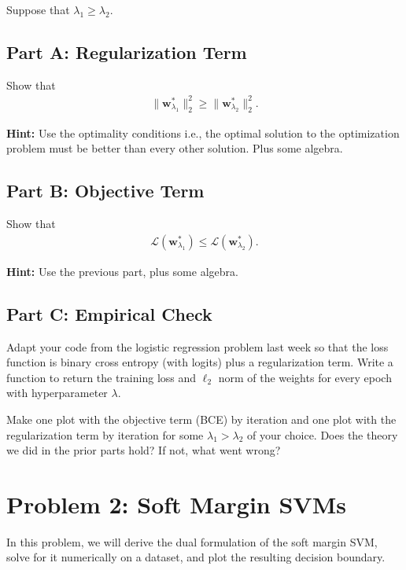 \documentclass{article}
\begin{document}
Suppose that $\lambda_1 \geq \lambda_2$.

\subsection*{Part A: Regularization Term}

Show that
\begin{align}
    \| \mathbf{w}^*_{\lambda_1} \|_2^2 \geq
    \| \mathbf{w}^*_{\lambda_2} \|_2^2.
\end{align}

\textbf{Hint:} Use the optimality conditions i.e., the optimal solution to the optimization problem must be better than every other solution. Plus some algebra.


\subsection*{Part B: Objective Term}

Show that
\begin{align}
    \mathcal{L}(\mathbf{w}^*_{\lambda_1}) \leq
    \mathcal{L}(\mathbf{w}^*_{\lambda_2}).
\end{align}

\textbf{Hint:} Use the previous part, plus some algebra.

\subsection*{Part C: Empirical Check}

Adapt your code from the logistic regression problem last week so that the loss function is binary cross entropy (with logits) plus a regularization term.
Write a function to return the training loss and $\ell_2$ norm of the weights for every epoch with hyperparameter $\lambda$.

Make one plot with the objective term (BCE) by iteration and one plot with the regularization term by iteration for some $\lambda_1 > \lambda_2$ of your choice.
Does the theory we did in the prior parts hold?
If not, what went wrong?

%

\newpage
\section*{Problem 2: Soft Margin SVMs}

In this problem, we will derive the dual formulation of the soft margin SVM, solve for it numerically on a dataset, and plot the resulting decision boundary.
\end{document}
